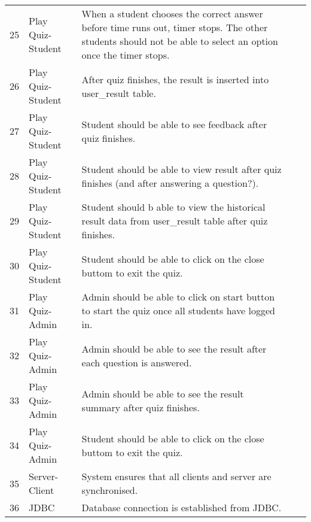 \begin{landscape}
\begin{longtabu}{c l X c c}
25 & Play Quiz-Student & When a student chooses the correct answer before time
runs out, timer stops. The other students should not be able to select an
option once the timer stops. & & \\

26 & Play Quiz-Student & After quiz finishes, the result is inserted into
user\_result table. & & \\

27 & Play Quiz-Student & Student should be able to see feedback after quiz
finishes. & & \\

28 & Play Quiz-Student & Student should be able to view result after quiz
finishes (and after answering a question?). & & \\

29 & Play Quiz-Student & Student should b able to view the historical result
data from user\_result table after quiz finishes. & & \\

30 & Play Quiz-Student & Student should be able to click on the close buttom to
exit the quiz. & & \\

31 & Play Quiz-Admin & Admin should be able to click on start button to start
the quiz once all students have logged in. & & \\

32 & Play Quiz-Admin & Admin should be able to see the result after each
question is answered. & & \\

33 & Play Quiz-Admin & Admin should be able to see the result summary after
quiz finishes. & & \\

34 & Play Quiz-Admin & Student should be able to click on the close buttom to
exit the quiz. & & \\

35 & Server-Client & System ensures that all clients and server are
synchronised. & & \\

36 & JDBC & Database connection is established from JDBC\@. & & \\
\bottomrule
\end{longtabu}
\end{landscape}
\restoregeometry%
